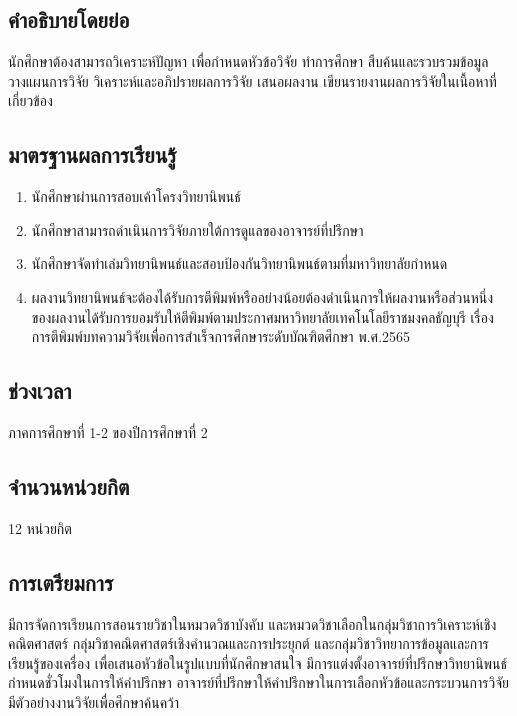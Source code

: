 {{{\subsection{คำอธิบายโดยย่อ}
นักศึกษาต้องสามารถวิเคราะห์ปัญหา เพื่อกำหนดหัวข้อวิจัย ทำการศึกษา สืบค้นและรวบรวมข้อมูล วางแผนการวิจัย วิเคราะห์และอภิปรายผลการวิจัย เสนอผลงาน เขียนรายงานผลการวิจัยในเนื้อหาที่เกี่ยวข้อง
\subsection{มาตรฐานผลการเรียนรู้}
\begin{enumerate}
	\item นักศึกษาผ่านการสอบเค้าโครงวิทยานิพนธ์
	\item นักศึกษาสามารถดำเนินการวิจัยภายใต้การดูแลของอาจารย์ที่ปรึกษา
	\item นักศึกษาจัดทำเล่มวิทยานิพนธ์และสอบป้องกันวิทยานิพนธ์ตามที่มหาวิทยาลัยกำหนด
	\item ผลงานวิทยานิพนธ์จะต้องได้รับการตีพิมพ์หรืออย่างน้อยต้องดำเนินการให้ผลงานหรือส่วนหนึ่งของผลงานได้รับการยอมรับให้ตีพิมพ์ตามประกาศมหาวิทยาลัยเทคโนโลยีราชมงคลธัญบุรี เรื่อง การตีพิมพ์บทความวิจัยเพื่อการสำเร็จการศึกษาระดับบัณฑิตศึกษา พ.ศ.2565
\end{enumerate}

\subsection{ช่วงเวลา}
ภาคการศึกษาที่ 1-2 ของปีการศึกษาที่ 
2

\subsection{จำนวนหน่วยกิต}
12 หน่วยกิต


\subsection{การเตรียมการ}

มีการจัดการเรียนการสอนรายวิชาในหมวดวิชาบังคับ และหมวดวิชาเลือกในกลุ่มวิชาการวิเคราะห์เชิงคณิตศาสตร์ กลุ่มวิชาคณิตศาสตร์เชิงคำนวณและการประยุกต์ และกลุ่มวิชาวิทยาการข้อมูลและการเรียนรู้ของเครื่อง เพื่อเสนอหัวข้อในรูปแบบที่นักศึกษาสนใจ มีการแต่งตั้งอาจารย์ที่ปรึกษาวิทยานิพนธ์ กำหนดชั่วโมงในการให้คำปรึกษา อาจารย์ที่ปรึกษาให้คำปรึกษาในการเลือกหัวข้อและกระบวนการวิจัย มีตัวอย่างงานวิจัยเพื่อศึกษาค้นคว้า

}}}
